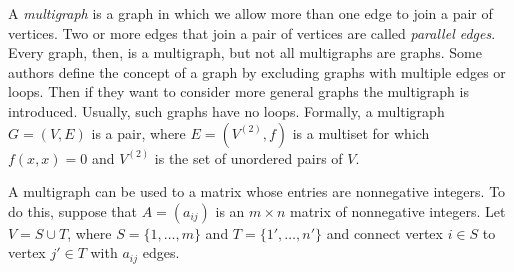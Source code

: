 \documentclass[12pt]{article}
\begin{document}
A \emph{multigraph} is a graph in which we allow more than one edge to join a pair of vertices. Two or more edges that join a pair of vertices are called \emph{parallel edges}. Every graph, then, is a multigraph, but not all multigraphs are graphs.
Some authors define the concept of a graph by excluding graphs with multiple 
edges or loops. Then if they want to consider more general graphs the 
multigraph is introduced. Usually, such graphs have no loops.
Formally, a multigraph $G=(V,  E)$ is a pair, where $E=(V^{(2)}, f)$
is a multiset for which $f(x,x) = 0$ and $V^{(2)}$ is the set of unordered pairs
of $V$.

A multigraph can be used to  a matrix whose entries are nonnegative integers. To do this, suppose that $A=(a_{ij})$ is an $m\times n$
matrix of nonnegative integers. 
Let $V=S \cup T$, where $S=\{1, \ldots , m\}$ and 
$T =\{1', \ldots , n'\}$ and connect vertex $i\in S$ to vertex $j'\in T$ with $a_{ij}$
edges. 
 

\end{document}
